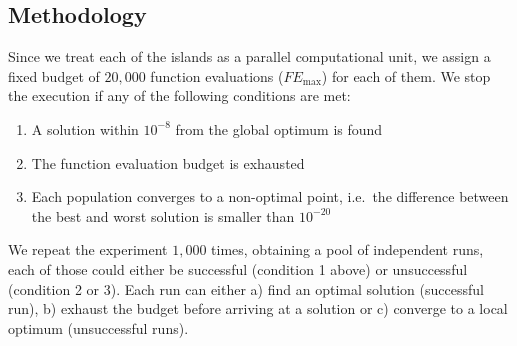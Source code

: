 \documentclass{sig-alternate}
\begin{document}

\subsection{Methodology}

Since we treat each of the islands as a parallel computational unit, we assign a fixed budget of $20,000$ function evaluations ($FE_{\mbox{max}}$) for each of them.
We stop the execution if any of the following conditions are met:
\begin{enumerate}
    \item A solution within $10^{-8}$ from the global optimum is found
    \item The function evaluation budget is exhausted
    \item Each population converges to a non-optimal point, i.e.\ the difference between the best and worst solution is smaller than $10^{-20}$
\end{enumerate}

We repeat the experiment $1,000$ times, obtaining a pool of independent runs, each of those could either be successful (condition 1 above) or unsuccessful (condition 2 or 3).
Each run can either a) find an optimal solution (successful run), b) exhaust the budget before arriving at a solution or c) converge to a local optimum (unsuccessful runs).
\end{document}
